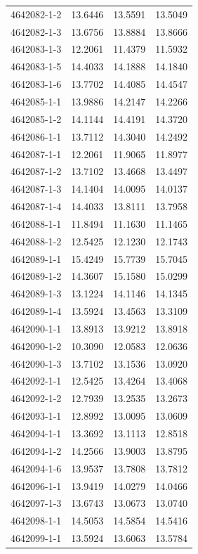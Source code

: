 \begin{longtable}{lrrr}
4642082-1-2 & 13.6446 & 13.5591 & 13.5049 \\
4642082-1-3 & 13.6756 & 13.8884 & 13.8666 \\
4642083-1-3 & 12.2061 & 11.4379 & 11.5932 \\
4642083-1-5 & 14.4033 & 14.1888 & 14.1840 \\
4642083-1-6 & 13.7702 & 14.4085 & 14.4547 \\
4642085-1-1 & 13.9886 & 14.2147 & 14.2266 \\
4642085-1-2 & 14.1144 & 14.4191 & 14.3720 \\
4642086-1-1 & 13.7112 & 14.3040 & 14.2492 \\
4642087-1-1 & 12.2061 & 11.9065 & 11.8977 \\
4642087-1-2 & 13.7102 & 13.4668 & 13.4497 \\
4642087-1-3 & 14.1404 & 14.0095 & 14.0137 \\
4642087-1-4 & 14.4033 & 13.8111 & 13.7958 \\
4642088-1-1 & 11.8494 & 11.1630 & 11.1465 \\
4642088-1-2 & 12.5425 & 12.1230 & 12.1743 \\
4642089-1-1 & 15.4249 & 15.7739 & 15.7045 \\
4642089-1-2 & 14.3607 & 15.1580 & 15.0299 \\
4642089-1-3 & 13.1224 & 14.1146 & 14.1345 \\
4642089-1-4 & 13.5924 & 13.4563 & 13.3109 \\
4642090-1-1 & 13.8913 & 13.9212 & 13.8918 \\
4642090-1-2 & 10.3090 & 12.0583 & 12.0636 \\
4642090-1-3 & 13.7102 & 13.1536 & 13.0920 \\
4642092-1-1 & 12.5425 & 13.4264 & 13.4068 \\
4642092-1-2 & 12.7939 & 13.2535 & 13.2673 \\
4642093-1-1 & 12.8992 & 13.0095 & 13.0609 \\
4642094-1-1 & 13.3692 & 13.1113 & 12.8518 \\
4642094-1-2 & 14.2566 & 13.9003 & 13.8795 \\
4642094-1-6 & 13.9537 & 13.7808 & 13.7812 \\
4642096-1-1 & 13.9419 & 14.0279 & 14.0466 \\
4642097-1-3 & 13.6743 & 13.0673 & 13.0740 \\
4642098-1-1 & 14.5053 & 14.5854 & 14.5416 \\
4642099-1-1 & 13.5924 & 13.6063 & 13.5784 \\

\end{longtable}
